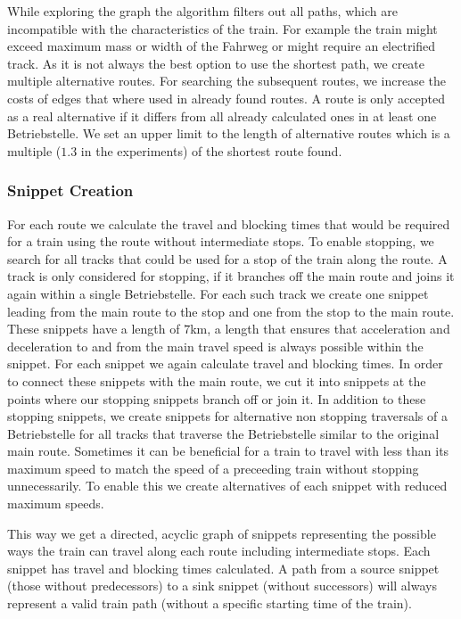 While exploring the graph the algorithm filters out all paths, which are incompatible with the characteristics of the train. For example the train might exceed maximum mass or width of the Fahrweg or might require an electrified track.
As it is not always the best option to use the shortest path, we create multiple alternative routes. For searching the subsequent routes, we increase the costs of edges that where used in already found routes. A route is only accepted as a real alternative if it differs from all already calculated ones in at least one Betriebstelle. We set an upper limit to the length of alternative routes which is a multiple ($1.3$ in the experiments) of the shortest route found.


\subsubsection{Snippet Creation}
%
For each route we calculate the travel and blocking times that would be required for a train using the route without intermediate stops. To enable stopping, we search for all tracks that could be used for a stop of the train along the route. A track is only considered for stopping, if it branches off the main route and joins it again within a single Betriebstelle. For each such track we create one snippet leading from the main route to the stop and one from the stop to the main route. These snippets have a length of $7$km, a length that ensures that acceleration and deceleration to and from the main travel speed is always possible within the snippet. For each snippet we again calculate travel and blocking times. In order to connect these snippets with the main route, we cut it into snippets at the points where our stopping snippets branch off or join it. In addition to these stopping snippets, we create snippets for alternative non stopping traversals of a Betriebstelle for all tracks that traverse the Betriebstelle similar to the original main route. Sometimes it can be beneficial for a train to travel with less than its maximum speed to match the speed of a preceeding train without stopping unnecessarily. To enable this we create alternatives of each snippet with reduced maximum speeds.

This way we get a directed, acyclic graph of snippets representing the possible ways the train can travel along each route including intermediate stops. Each snippet has travel and blocking times calculated. A path from a source snippet (those without predecessors) to a sink snippet (without successors) will always represent a valid train path (without a specific starting time of the train).


